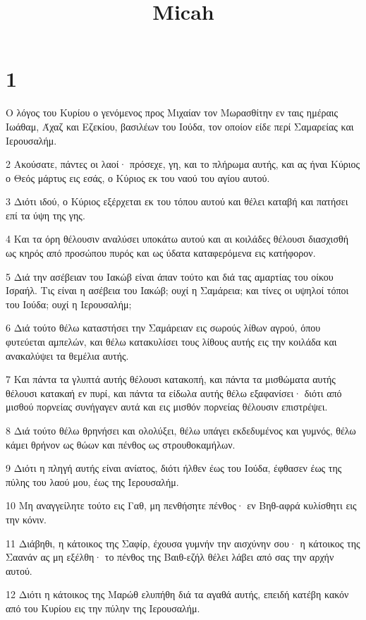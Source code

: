 

\title{Micah}


\chapter{1}

\par Ο λόγος του Κυρίου ο γενόμενος προς Μιχαίαν τον Μωρασθίτην εν ταις ημέραις Ιωάθαμ, Άχαζ και Εζεκίου, βασιλέων του Ιούδα, τον οποίον είδε περί Σαμαρείας και Ιερουσαλήμ.
\par 2 Ακούσατε, πάντες οι λαοί· πρόσεχε, γη, και το πλήρωμα αυτής, και ας ήναι Κύριος ο Θεός μάρτυς εις εσάς, ο Κύριος εκ του ναού του αγίου αυτού.
\par 3 Διότι ιδού, ο Κύριος εξέρχεται εκ του τόπου αυτού και θέλει καταβή και πατήσει επί τα ύψη της γης.
\par 4 Και τα όρη θέλουσιν αναλύσει υποκάτω αυτού και αι κοιλάδες θέλουσι διασχισθή ως κηρός από προσώπου πυρός και ως ύδατα καταφερόμενα εις κατήφορον.
\par 5 Διά την ασέβειαν του Ιακώβ είναι άπαν τούτο και διά τας αμαρτίας του οίκου Ισραήλ. Τις είναι η ασέβεια του Ιακώβ; ουχί η Σαμάρεια; και τίνες οι υψηλοί τόποι του Ιούδα; ουχί η Ιερουσαλήμ;
\par 6 Διά τούτο θέλω καταστήσει την Σαμάρειαν εις σωρούς λίθων αγρού, όπου φυτεύεται αμπελών, και θέλω κατακυλίσει τους λίθους αυτής εις την κοιλάδα και ανακαλύψει τα θεμέλια αυτής.
\par 7 Και πάντα τα γλυπτά αυτής θέλουσι κατακοπή, και πάντα τα μισθώματα αυτής θέλουσι κατακαή εν πυρί, και πάντα τα είδωλα αυτής θέλω εξαφανίσει· διότι από μισθού πορνείας συνήγαγεν αυτά και εις μισθόν πορνείας θέλουσιν επιστρέψει.
\par 8 Διά τούτο θέλω θρηνήσει και ολολύξει, θέλω υπάγει εκδεδυμένος και γυμνός, θέλω κάμει θρήνον ως θώων και πένθος ως στρουθοκαμήλων.
\par 9 Διότι η πληγή αυτής είναι ανίατος, διότι ήλθεν έως του Ιούδα, έφθασεν έως της πύλης του λαού μου, έως της Ιερουσαλήμ.
\par 10 Μη αναγγείλητε τούτο εις Γαθ, μη πενθήσητε πένθος· εν Βηθ-αφρά κυλίσθητι εις την κόνιν.
\par 11 Διάβηθι, η κάτοικος της Σαφίρ, έχουσα γυμνήν την αισχύνην σου· η κάτοικος της Σαανάν ας μη εξέλθη· το πένθος της Βαιθ-εζήλ θέλει λάβει από σας την αρχήν αυτού.
\par 12 Διότι η κάτοικος της Μαρώθ ελυπήθη διά τα αγαθά αυτής, επειδή κατέβη κακόν από του Κυρίου εις την πύλην της Ιερουσαλήμ.

